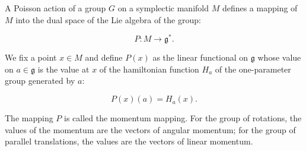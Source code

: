 A Poisson action of a group $G$ on a symplectic manifold $M$ defines a mapping of $M$ into the dual space of the Lie algebra of the group:

$$P: M \rightarrow \mathfrak{g}^*.$$

We fix a point $x \in M$ and define $P(x)$ as the linear functional on $\mathfrak{g}$ whose value on $a \in \mathfrak{g}$ is the value at $x$ of the hamiltonian function $H_a$ of the one-parameter group generated by $a$:

$$P(x)(a) = H_a(x).$$

The mapping $P$ is called the momentum mapping. For the group of rotations, the values of the momentum are the vectors of angular momentum; for the group of parallel translations, the values are the vectors of linear momentum.
